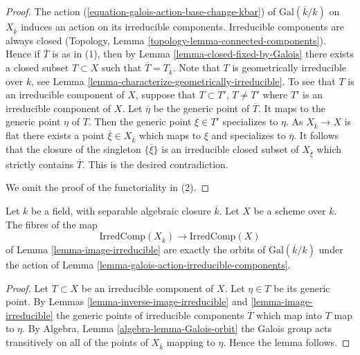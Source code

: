 \begin{proof}
The action (\ref{equation-galois-action-base-change-kbar})
of $\text{Gal}(\overline{k}/k)$ on $X_{\overline{k}}$
induces an action on its irreducible components.
Irreducible components are always closed
(Topology, Lemma \ref{topology-lemma-connected-components}).
Hence if $\overline{T}$ is as in (1), then by
Lemma \ref{lemma-closed-fixed-by-Galois} there exists a closed
subset $T \subset X$ such that $\overline{T} = T_{\overline{k}}$.
Note that $T$ is geometrically irreducible over $k$, see
Lemma \ref{lemma-characterize-geometrically-irreducible}.
To see that $T$ is an irreducible component of $X$, suppose that
$T \subset T'$, $T \not = T'$ where $T'$ is an irreducible
component of $X$. Let $\overline{\eta}$ be the generic point of
$\overline{T}$. It maps to the generic point $\eta$ of $T$.
Then the generic point $\xi \in T'$ specializes to $\eta$.
As $X_{\overline{k}} \to X$ is flat there exists a point
$\overline{\xi} \in X_{\overline{k}}$ which maps to $\xi$ and
specializes to $\overline{\eta}$. It follows that
the closure of the singleton $\{\overline{\xi}\}$ is an
irreducible closed subset of $X_{\overline{\xi}}$ which
strictly contains $\overline{T}$. This is the desired contradiction.

\medskip\noindent
We omit the proof of the functoriality in (2).
\end{proof}

\begin{lemma}
\label{lemma-orbit-irreducible-components}
Let $k$ be a field, with separable algebraic closure $\overline{k}$.
Let $X$ be a scheme over $k$.
The fibres of the map
$$
\text{IrredComp}(X_{\overline{k}})
\longrightarrow
\text{IrredComp}(X)
$$
of
Lemma \ref{lemma-image-irreducible}
are exactly the orbits of $\text{Gal}(\overline{k}/k)$ under the action of
Lemma \ref{lemma-galois-action-irreducible-components}.
\end{lemma}

\begin{proof}
Let $T \subset X$ be an irreducible component of $X$.
Let $\eta \in T$ be its generic point. By
Lemmas \ref{lemma-inverse-image-irreducible} and
\ref{lemma-image-irreducible}
the generic points of irreducible components $\overline{T}$ which map into $T$
map to $\eta$. By
Algebra, Lemma \ref{algebra-lemma-Galois-orbit}
the Galois group acts transitively on
all of the points of $X_{\overline{k}}$ mapping to $\eta$.
Hence the lemma follows.
\end{proof}

